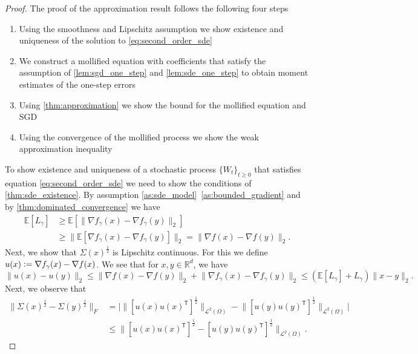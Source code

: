 \documentclass[12pt]{article}
\theoremstyle{definition}
\numberwithin{equation}{section}
\newcommand{\R}{\mathbb{R}}
\newcommand{\CL}{\mathcal{L}}
\newcommand{\T}{\mathsf{T}}
\newcommand{\ev}[1]{\mathbb{E}\left[{#1}\right]}
\newcommand{\norm}[1]{\lVert{#1}\rVert_2}
\newcommand{\normf}[1]{\lVert{#1}\rVert_F}
\newcommand{\norml}[1]{\lVert{#1}\rVert_{\CL^2(\Omega)}}
\newcommand{\defeq}{\vcentcolon=}
\begin{document}
\begin{proof}
  The proof of the approximation result follows the following four steps
  \begin{enumerate}
    \item Using the smoothness and Lipschitz assumption we show existence and uniqueness of the solution to \eqref{eq:second_order_sde}
    \item We construct a mollified equation with coefficients that satisfy the assumption of \autoref{lem:sgd_one_step} and \autoref{lem:sde_one_step} to obtain moment estimates of the one-step errors
    \item Using \autoref{thm:approximation} we show the bound for the mollified equation and SGD
    \item Using the convergence of the mollified process we show the weak approximation inequality
  \end{enumerate}
  To show existence and uniqueness of a stochastic process $\{W_t\}_{t\geq 0}$ that satisfies equation \eqref{eq:second_order_sde} we need to show the conditions of \autoref{thm:sde_existence}.
  By assumption \autoref{as:sde_model}~\ref{as:bounded_gradient} and by \autoref{thm:dominated_convergence} we have
  \begin{align*}
    \ev{L_{\gamma}} &\geq \ev{\norm{\nabla f_{\gamma}(x) - \nabla f_{\gamma}(y)}} \\
    &\geq \norm{\ev{\nabla f_{\gamma}(x) - \nabla f_{\gamma}(y)}}
    = \norm{\nabla f(x) - \nabla f(y)}.
  \end{align*}
  Next, we show that $\Sigma(x)^{\frac{1}{2}}$ is Lipschitz continuous. For this we define $u(x) \defeq \nabla f_{\gamma}(x) - \nabla f(x)$. We see that for $x,y \in \R^d$, we have
  \begin{equation}
    \label{eq:u_lipschitz}
    \norm{u(x) - u(y)} \leq \norm{\nabla f(x) - \nabla f(y)} + \norm{\nabla f_{\gamma}(x) - \nabla f_{\gamma}(y)} \leq \left(\ev{L_{\gamma}} + L_{\gamma}\right)\norm{x-y}.
  \end{equation}
  Next, we observe that
  \begin{equation}
    \label{eq:sigma_inequality}
    \begin{split}
      \normf{\Sigma(x)^{\frac{1}{2}} - \Sigma(y)^{\frac{1}{2}}} &= \lvert \norml{[u(x)u(x)^\T]^{\frac{1}{2}}} - \norml{[u(y)u(y)^\T]^{\frac{1}{2}}} \rvert \\
      &\leq \norml{[u(x)u(x)^\T]^{\frac{1}{2}} - [u(y)u(y)^\T]^{\frac{1}{2}}}.
    \end{split}
  \end{equation}

\end{proof}
\end{document}
